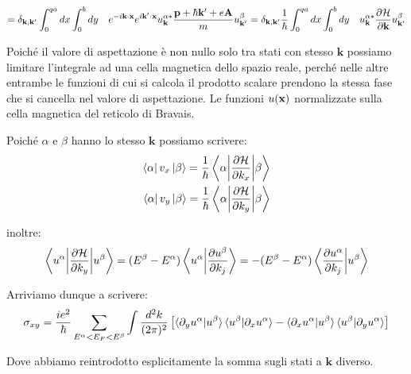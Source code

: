 \documentclass[12pt,a4paper]{article}
\begin{document}
\[
=\delta_{\mathbf{k}, \mathbf{k'}} \int_{0}^{qa} dx \int_{0}^{b} dy  \quad e^{-i \bold{k} \cdot \bold{x}} e^{i \bold{k'} \cdot \bold{x}} u_{\mathbf{k}}^{\alpha *} \frac{\bold{p} + \hbar \bold{k'} + e \bold{A}}{m}  u_{\mathbf{k'}}^{\beta}= \delta_{\mathbf{k}, \mathbf{k'}} \frac{1}{\hbar}\int_{0}^{qa} dx \int_{0}^{b} dy  \quad u_{\mathbf{k}}^{\alpha *} \frac{\partial \mathcal{H}}{\partial \bold{k}}  u_{\mathbf{k'}}^{\beta}
\]


Poiché il valore di aspettazione è non nullo solo tra stati con stesso $\mathbf{k}$ possiamo limitare l'integrale ad una cella magnetica dello spazio reale, perché nelle altre entrambe le funzioni di cui si calcola il prodotto scalare prendono la stessa fase che si cancella nel valore di aspettazione. Le funzioni $u(\bold{x})$ normalizzate sulla cella magnetica del reticolo di Bravais.

Poiché $\alpha$ e $\beta$ hanno lo stesso $\mathbf{k}$ possiamo scrivere:
\begin{equation}
\begin{split}
\bra{\alpha} v_{x} \ket{\beta} = \frac{1}{\hbar} \left \langle {\alpha} \bigg{|} \frac{\partial \mathcal{H}}{\partial k_x} \bigg{|} \beta \right \rangle \\
\bra{\alpha} v_{y} \ket{\beta} = \frac{1}{\hbar}  \left \langle \alpha \bigg{|} \frac{\partial \mathcal{H}}{\partial k_y} \bigg{|} \beta \right \rangle\\
\end{split}
\end{equation}

inoltre:
\begin{equation}
\left \langle u^\alpha \bigg{|} \frac{\partial \mathcal{H}}{\partial k_y} \bigg{|} {u^\beta} \right \rangle = (E^{\beta} - E^{\alpha}) \left \langle u^\alpha \bigg{|}\frac{\partial u^{\beta}}{\partial k_{j}} \right \rangle = - (E^{\beta} - E^{\alpha})\left \langle \frac{\partial u ^{\alpha}}{\partial k_{j}} \bigg{|} u^\beta \right \rangle
\end{equation}

Arriviamo dunque a scrivere:
\begin{equation}
\sigma_{xy} = \frac{i e^2}{\hbar} \sum_{E^{\alpha} < E_{F} < E^{\beta}} \int \frac{d^2 k}{(2 \pi)^2} \left[\braket{\partial_y u^{\alpha} | u^{\beta}} \braket{u^{\beta}|\partial_x u^{\alpha}} - \braket{\partial_x u^{\alpha}|u^{\beta}}\braket{u^{\beta}|\partial_y u^{\alpha}}\right]
\end{equation}

Dove abbiamo reintrodotto esplicitamente la somma sugli stati a $\mathbf{k}$ diverso.
\end{document}
